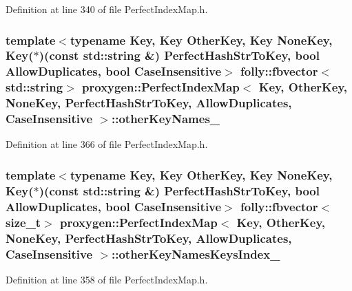 Definition at line 340 of file Perfect\+Index\+Map.\+h.

\subsubsection[{other\+Key\+Names\+\_\+}]{\setlength{\rightskip}{0pt plus 5cm}template$<$typename Key, Key Other\+Key, Key None\+Key, Key($\ast$)(const std\+::string \&) Perfect\+Hash\+Str\+To\+Key, bool Allow\+Duplicates, bool Case\+Insensitive$>$ folly\+::fbvector$<$std\+::string$>$ {\bf proxygen\+::\+Perfect\+Index\+Map}$<$ Key, Other\+Key, None\+Key, Perfect\+Hash\+Str\+To\+Key, Allow\+Duplicates, Case\+Insensitive $>$\+::other\+Key\+Names\+\_\+\hspace{0.3cm}{\ttfamily [private]}}\label{classproxygen_1_1PerfectIndexMap_ae3d317317c670e3432ddc5f22f1ab38a}


Definition at line 366 of file Perfect\+Index\+Map.\+h.

\subsubsection[{other\+Key\+Names\+Keys\+Index\+\_\+}]{\setlength{\rightskip}{0pt plus 5cm}template$<$typename Key, Key Other\+Key, Key None\+Key, Key($\ast$)(const std\+::string \&) Perfect\+Hash\+Str\+To\+Key, bool Allow\+Duplicates, bool Case\+Insensitive$>$ folly\+::fbvector$<$size\+\_\+t$>$ {\bf proxygen\+::\+Perfect\+Index\+Map}$<$ Key, Other\+Key, None\+Key, Perfect\+Hash\+Str\+To\+Key, Allow\+Duplicates, Case\+Insensitive $>$\+::other\+Key\+Names\+Keys\+Index\+\_\+\hspace{0.3cm}{\ttfamily [private]}}\label{classproxygen_1_1PerfectIndexMap_a1111beef659a6f63bd448945e5256a3a}


Definition at line 358 of file Perfect\+Index\+Map.\+h.

